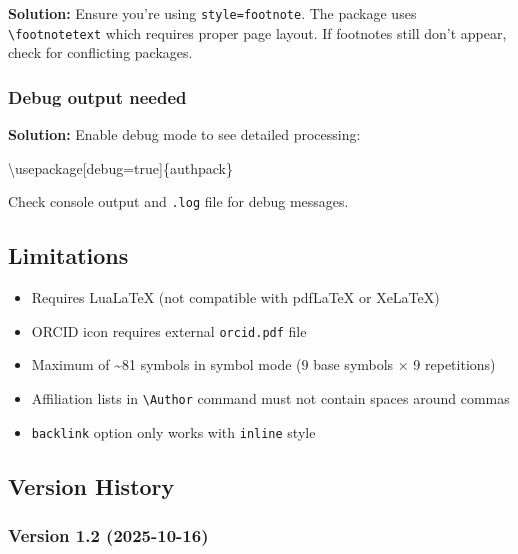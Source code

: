 \documentclass[
]{article}
\newenvironment{Shaded}{}{}
\newcommand{\BuiltInTok}[1]{#1}
\newcommand{\ExtensionTok}[1]{#1}
\newcommand{\NormalTok}[1]{#1}
\providecommand{\tightlist}{%
  \setlength{\itemsep}{0pt}\setlength{\parskip}{0pt}}
\begin{document}
\textbf{Solution:} Ensure you're using \texttt{style=footnote}. The
package uses \texttt{\textbackslash{}footnotetext} which requires proper
page layout. If footnotes still don't appear, check for conflicting
packages.

\hypertarget{debug-output-needed}{%
\subsubsection{Debug output needed}\label{debug-output-needed}}

\textbf{Solution:} Enable debug mode to see detailed processing:

\begin{Shaded}
\begin{Highlighting}[]
\BuiltInTok{\textbackslash{}usepackage}\NormalTok{[debug=true]\{}\ExtensionTok{authpack}\NormalTok{\}}
\end{Highlighting}
\end{Shaded}

Check console output and \texttt{.log} file for debug messages.

\hypertarget{limitations}{%
\subsection{Limitations}\label{limitations}}

\begin{itemize}
\tightlist
\item
  Requires LuaLaTeX (not compatible with pdfLaTeX or XeLaTeX)
\item
  ORCID icon requires external \texttt{orcid.pdf} file
\item
  Maximum of \textasciitilde81 symbols in symbol mode (9 base symbols ×
  9 repetitions)
\item
  Affiliation lists in \texttt{\textbackslash{}Author} command must not
  contain spaces around commas
\item
  \texttt{backlink} option only works with \texttt{inline} style
\end{itemize}

\hypertarget{version-history}{%
\subsection{Version History}\label{version-history}}

\hypertarget{version-1.2-2025-10-16}{%
\subsubsection{Version 1.2 (2025-10-16)}\label{version-1.2-2025-10-16}}
\end{document}
